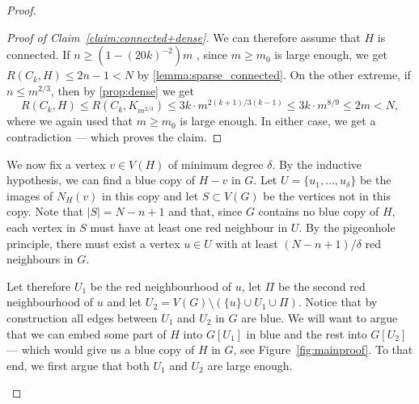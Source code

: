\documentclass{article}
\newcommand*{\myproofname}{Proof}
\newenvironment{claimproof}[1][\myproofname]{\begin{proof}[#1]\renewcommand*{\qedsymbol}{\(\diamondsuit\)}}{\end{proof}}
\newcommand{\kp}[1]{\textcolor{teal}{\textbf{[KP: } #1\textbf{]}}}
\newcommand{\PM}[1]{\textcolor{blue}{\textbf{[PM: } #1\textbf{]}}}
\begin{document}
\begin{proof}
\begin{claimproof}[Proof of Claim~\ref{claim:connected+dense}]
        We can therefore assume that $H$ is connected.
        If $n \geq (1-(20k)^{-2})m$ 
        , since $m \geq m_0$ is large enough, we get $R(C_k, H) \leq 2n  -1 < N$ by \cref{lemma:sparse_connected}.
        On the other extreme, if $n \leq m^{2/3}$, then by \cref{prop:dense} we get
        \[
            R(C_k, H) \leq R(C_k, K_{m^{2/3}}) \leq 3k \cdot m^{2(k+1)/3(k-1)}\le   3k \cdot m^{8/9}\leq 2m < N,
        \]
        where we again used that $m \geq m_0$ is large enough.
        In either case, we get a contradiction --- which proves the claim.
    \end{claimproof}

    We now fix a vertex $v \in V(H)$ of minimum degree $\delta$.
    By the inductive hypothesis, we can find a blue copy of $H - v$ in $G$.
    Let $U = \{u_1, \dots, u_{\delta}\}$ be the images of $N_H(v)$  in this copy and let $S \subset V(G)$ be the vertices not in this copy.
    Note that $|S| = N - n + 1$ and that, since $G$ contains no blue copy of $H$, each vertex in $S$ must have at least one red neighbour in $U$.
    By the pigeonhole principle, there must exist a vertex $u \in U$ with at least $(N - n + 1) /\delta$ red neighbours in $G$.
    
    Let therefore $U_1$ be the red neighbourhood of $u$, let $\Pi$ be the second red neighbourhood of $u$ and let $U_2 = V(G) \setminus (\{u\} \cup U_1 \cup \Pi )$.
    Notice that by construction all edges between $U_1$ and $U_2$ in $G$ are blue.
    We will want to argue that we can embed some part of $H$ into $G[U_1]$ in blue and the rest into $G[U_2]$ --- which would give us a blue copy of $H$ in $G$, see Figure~\ref{fig:mainproof}.
    To that end, we first argue that both $U_1$ and $U_2$ are large enough.

    \begin{figure}
\centering
\end{figure}
\end{proof}
\end{document}
